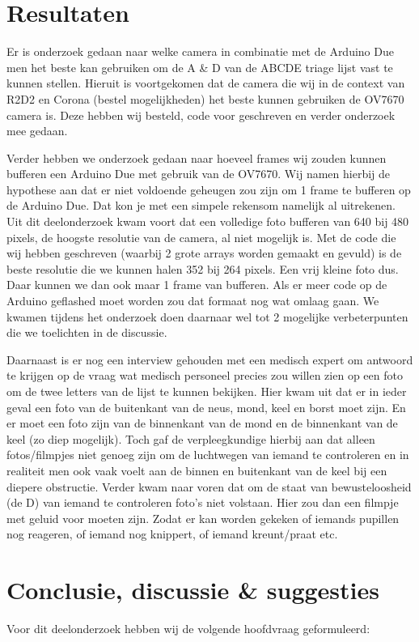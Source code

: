 \documentclass{article}
\begin{document}
\section{Resultaten}
Er is onderzoek gedaan naar welke camera in combinatie met de Arduino Due men het beste kan gebruiken om de A \& D van de ABCDE triage lijst vast te kunnen stellen. Hieruit is voortgekomen dat de camera die wij in de context van R2D2 en Corona (bestel mogelijkheden) het beste kunnen gebruiken de OV7670 camera is. Deze hebben wij besteld, code voor geschreven en verder onderzoek mee gedaan.

Verder hebben we onderzoek gedaan naar hoeveel frames wij zouden kunnen bufferen een Arduino Due met gebruik van de OV7670. Wij namen hierbij de hypothese aan dat er niet voldoende geheugen zou zijn om 1 frame te bufferen op de Arduino Due. Dat kon je met een simpele rekensom namelijk al uitrekenen. Uit dit deelonderzoek kwam voort dat een volledige foto bufferen van 640 bij 480 pixels, de hoogste resolutie van de camera, al niet mogelijk is. Met de code die wij hebben geschreven (waarbij 2 grote arrays worden gemaakt en gevuld) is de beste resolutie die we kunnen halen 352 bij 264 pixels. Een vrij kleine foto dus. Daar kunnen we dan ook maar 1 frame van bufferen. Als er meer code op de Arduino geflashed moet worden zou dat formaat nog wat omlaag gaan. We kwamen tijdens het onderzoek doen daarnaar wel tot 2 mogelijke verbeterpunten die we toelichten in de discussie.

Daarnaast is er nog een interview gehouden met een medisch expert om antwoord te krijgen op de vraag wat medisch personeel precies zou willen zien op een foto om de twee letters van de lijst te kunnen bekijken. Hier kwam uit dat er in ieder geval een foto van de buitenkant van de neus, mond, keel en borst moet zijn. En er moet een foto zijn van de binnenkant van de mond en de binnenkant van de keel (zo diep mogelijk). Toch gaf de verpleegkundige hierbij aan dat alleen fotos/filmpjes niet genoeg zijn om de luchtwegen van iemand te controleren en in realiteit men ook vaak voelt aan de binnen en buitenkant van de keel bij een diepere obstructie. Verder kwam naar voren dat om de staat van bewusteloosheid (de D) van iemand te controleren foto’s niet volstaan. Hier zou dan een filmpje met geluid voor moeten zijn. Zodat er kan worden gekeken of iemands pupillen nog reageren, of iemand nog knippert, of iemand kreunt/praat etc. 

\section{Conclusie, discussie \& suggesties}
Voor dit deelonderzoek hebben wij de volgende hoofdvraag geformuleerd:
\end{document}

